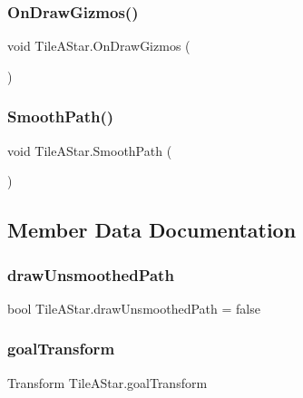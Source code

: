 \subsubsection{\texorpdfstring{On\+Draw\+Gizmos()}{OnDrawGizmos()}}
{\footnotesize\ttfamily void Tile\+A\+Star.\+On\+Draw\+Gizmos (\begin{DoxyParamCaption}{ }\end{DoxyParamCaption})}

\mbox{\label{class_tile_a_star_a2c93e6c430d2b7cc8bde48f8f9b6c1d1}} 
\subsubsection{\texorpdfstring{Smooth\+Path()}{SmoothPath()}}
{\footnotesize\ttfamily void Tile\+A\+Star.\+Smooth\+Path (\begin{DoxyParamCaption}{ }\end{DoxyParamCaption})}



\subsection{Member Data Documentation}
\mbox{\label{class_tile_a_star_ad703b3c8e7da213a77f48aac7a31a584}} 
\subsubsection{\texorpdfstring{draw\+Unsmoothed\+Path}{drawUnsmoothedPath}}
{\footnotesize\ttfamily bool Tile\+A\+Star.\+draw\+Unsmoothed\+Path = false}

\mbox{\label{class_tile_a_star_aaa0642f5a2f60fb38db368e8681f561d}} 
\subsubsection{\texorpdfstring{goal\+Transform}{goalTransform}}
{\footnotesize\ttfamily Transform Tile\+A\+Star.\+goal\+Transform}

